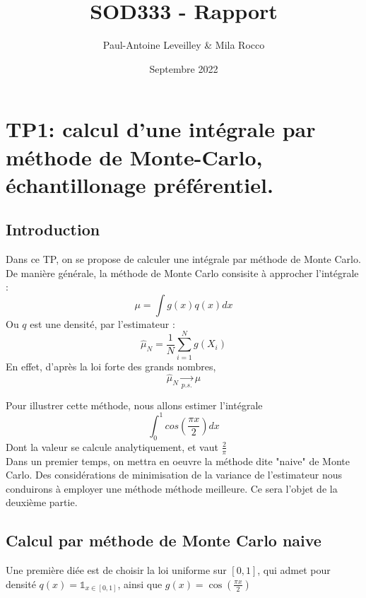 \documentclass{article}
\title{SOD333 - Rapport}
\author{Paul-Antoine Leveilley \& Mila Rocco}
\date{Septembre 2022}
\begin{document}
\maketitle

\newpage
\tableofcontents
\newpage







\newpage
\section{TP1: calcul d'une intégrale par méthode de Monte-Carlo, échantillonage préférentiel.}
\subsection{Introduction}
Dans ce TP, on se propose de calculer une intégrale par méthode de Monte Carlo. De manière générale, la méthode de Monte Carlo
consisite à approcher l'intégrale : 
\[\mu = \int g(x)q(x)dx\] 
Ou $q$ est une densité, par l'estimateur : 
\begin{equation}
  \label{estim}
  \hat{\mu}_N = \frac{1}{N} \sum_{i=1}^N g(X_i)
\end{equation}
En effet, d'après la loi forte des grands nombres, 
\[\hat{\mu}_N\underset{p.s.}{\longrightarrow}\mu \] 

Pour illustrer cette méthode, nous allons estimer l'intégrale 
\[\int_0^1 cos(\frac{\pi x}{2})dx\]
Dont la valeur se calcule analytiquement, et vaut $\frac{2}{\pi}$ \\
Dans un premier temps, on mettra en oeuvre la méthode dite "naive" de Monte Carlo. Des considérations de minimisation de
la variance de l'estimateur nous conduirons à employer une méthode méthode 
meilleure. Ce sera l'objet de la deuxième partie.\\ 

 \subsection{Calcul par méthode de Monte Carlo naive}
Une première diée est de choisir la loi uniforme sur $[0,1]$, qui admet pour densité $q(x) = \mathbb{1}_{x \in [0,1]}$, ainsi que $g(x) = \cos (\frac{\pi x}{2})$
\end{document}
